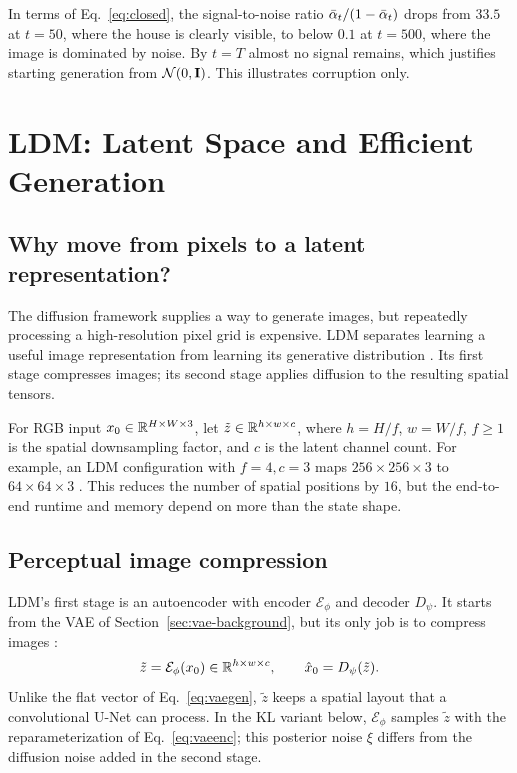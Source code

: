In terms of Eq.~\eqref{eq:closed}, the signal-to-noise ratio
$\bar{\alpha}_t/(1-\bar{\alpha}_t)$ drops from $33.5$ at $t=50$, where the house is clearly visible, to below $0.1$
at $t=500$, where the image is dominated by noise. By $t=T$ almost no
signal remains, which justifies starting generation from
$\mathcal{N}(0,\mathbf{I})$. This illustrates corruption only.

\section{LDM: Latent Space and Efficient Generation}\label{sec:ldm}
\subsection{Why move from pixels to a latent representation?}\label{sec:synthesis}
The diffusion framework supplies a way to generate images, but repeatedly processing a
high-resolution pixel grid is expensive. LDM separates learning a useful
image representation from learning its generative distribution
\cite[Secs.~3.1--3.2]{rombach2022ldm}. Its first stage compresses images;
its second stage applies diffusion to the resulting spatial tensors.

For RGB input $x_0\in\mathbb{R}^{H\times W\times3}$, let
$\tilde z\in\mathbb{R}^{h\times w\times c}$, where $h=H/f$, $w=W/f$,
$f\ge1$ is the spatial downsampling factor, and $c$ is the latent channel
count. For example, an LDM configuration with $f=4,c=3$ maps
$256\times256\times3$ to $64\times64\times3$
\cite[Table~8]{rombach2022ldm}. This reduces the number of spatial positions
by $16$, but the end-to-end runtime and memory depend on more than the
state shape.

\subsection{Perceptual image compression}\label{sec:vae}
LDM's first stage is an autoencoder with encoder $\mathcal E_\phi$ and
decoder $D_\psi$. It starts from the VAE of
Section~\ref{sec:vae-background}, but its only job is to compress images
\cite[Sec.~3.1]{rombach2022ldm}:
\begin{equation}
\tilde z=\mathcal E_\phi(x_0)\in\mathbb{R}^{h\times w\times c},\qquad
\hat x_0=D_\psi(\tilde z).\label{eq:vae}
\end{equation}
Unlike the flat vector of Eq.~\eqref{eq:vaegen}, $\tilde z$ keeps a
spatial layout that a convolutional U-Net \cite{ronneberger2015unet} can
process. In the KL variant below, $\mathcal E_\phi$ samples $\tilde z$ with
the reparameterization of Eq.~\eqref{eq:vaeenc}; this posterior noise $\xi$
differs from the diffusion noise added in the second stage.

